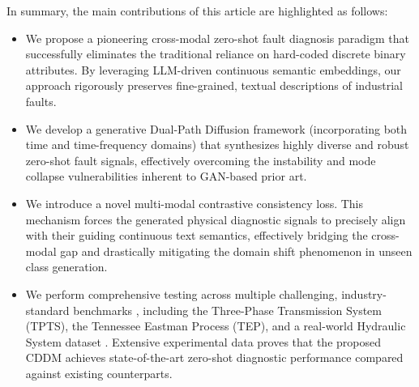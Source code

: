 In summary, the main contributions of this article are highlighted as follows:
\begin{itemize}
    \item We propose a pioneering cross-modal zero-shot fault diagnosis \cite{precup2015overview} paradigm \cite{hu2023semantic,liu2023dsd} that successfully eliminates the traditional reliance on hard-coded discrete binary attributes. By leveraging LLM-driven continuous semantic embeddings, our approach rigorously preserves fine-grained, textual descriptions of industrial faults.
    \item We develop a generative Dual-Path Diffusion framework (incorporating both time and time-frequency domains) that synthesizes highly diverse and robust zero-shot fault signals, effectively overcoming the instability and mode collapse vulnerabilities inherent to GAN-based prior art.
    \item We introduce a novel multi-modal contrastive consistency loss. This mechanism forces the generated physical diagnostic signals to precisely align with their guiding continuous text semantics, effectively bridging the cross-modal gap and drastically mitigating the domain shift phenomenon in unseen class generation.
    \item We perform comprehensive testing \cite{zhao2022fagan} across multiple challenging, industry-standard benchmarks \cite{zhao2022fagan}, including the Three-Phase Transmission System (TPTS), the Tennessee Eastman Process (TEP), and a real-world Hydraulic System dataset \cite{liu2025spectral,zhang2022intelligent}. Extensive experimental data proves that the proposed CDDM achieves state-of-the-art zero-shot diagnostic performance compared against existing counterparts.
\end{itemize}